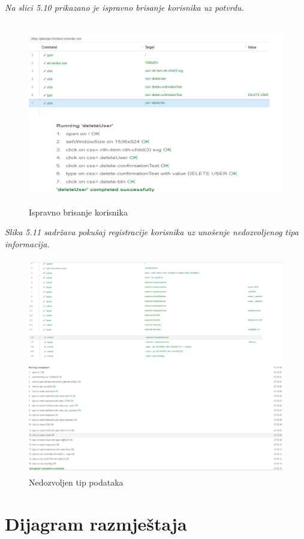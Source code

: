 \newpage
	\textit{
		Na slici 5.10 prikazano je ispravno brisanje korisnika uz potvrdu. }
	\begin{figure}[H]
		\centering
		\includegraphics[width=\textwidth,height=8cm]{slike/slike_testova/SELENIUM_IDE/6.PNG}
		\caption{Ispravno brisanje korisnika}
		\label{fig:my_label}
	\end{figure}
\textit{
	Slika 5.11 sadržava pokušaj registracije korisnika uz unošenje nedozvoljenog tipa informacija. }
\begin{figure}[H]
	\centering
	\includegraphics[width=\textwidth,height=9.5cm]{slike/slike_testova/SELENIUM_IDE/7.PNG}
	\caption{Nedozvoljen tip podataka}
	\label{fig:my_label}
\end{figure}
			\eject 
		
		
		\section{Dijagram razmještaja}
		\bigskip
		\bigskip
		
